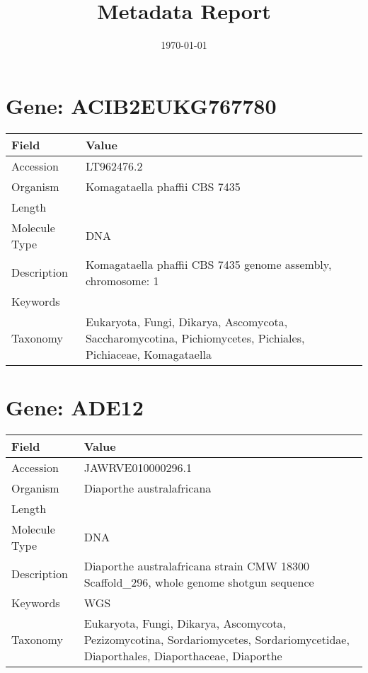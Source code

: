 \documentclass[10pt]{article}
\title{Metadata Report}
\date{\today}
\begin{document}
\maketitle
\tableofcontents
\clearpage
\section{Gene: ACIB2EUKG767780}
{\footnotesize
\begin{longtable}{>{\raggedright\arraybackslash}p{4.5cm} >{\raggedright\arraybackslash}p{11.5cm}}
\textbf{Field} & \textbf{Value} \\
\hline
Accession & LT962476.2 \\
Organism & Komagataella phaffii CBS 7435 \\
Length & 2895357 \\
Molecule Type & DNA \\
Description & Komagataella phaffii CBS 7435 genome assembly, chromosome: 1 \\
Keywords &  \\
Taxonomy & Eukaryota, Fungi, Dikarya, Ascomycota, Saccharomycotina, Pichiomycetes, Pichiales, Pichiaceae, Komagataella \\
\end{longtable}
}

\vspace{1em}
\section{Gene: ADE12}
{\footnotesize
\begin{longtable}{>{\raggedright\arraybackslash}p{4.5cm} >{\raggedright\arraybackslash}p{11.5cm}}
\textbf{Field} & \textbf{Value} \\
\hline
Accession & JAWRVE010000296.1 \\
Organism & Diaporthe australafricana \\
Length & 20257 \\
Molecule Type & DNA \\
Description & Diaporthe australafricana strain CMW 18300 Scaffold\_296, whole genome shotgun sequence \\
Keywords & WGS \\
Taxonomy & Eukaryota, Fungi, Dikarya, Ascomycota, Pezizomycotina, Sordariomycetes, Sordariomycetidae, Diaporthales, Diaporthaceae, Diaporthe \\
\end{longtable}
}

\vspace{1em}
\end{document}
